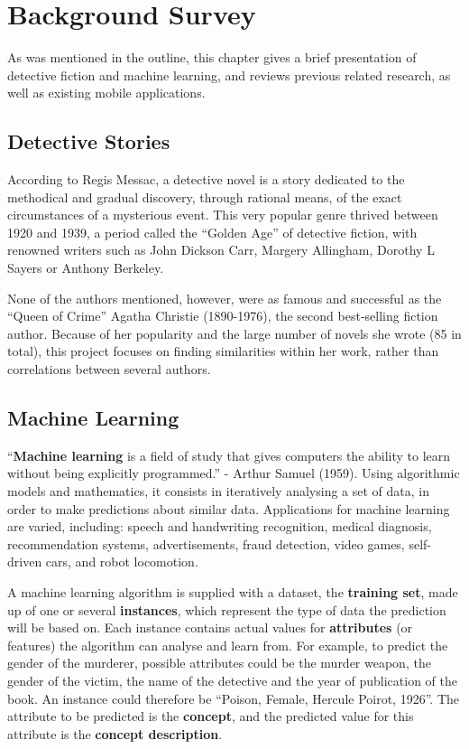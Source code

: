 \documentclass{mproj}
\begin{document}
\chapter{Background Survey}\label{survey}

As was mentioned in the outline, this chapter gives a brief presentation of detective fiction and machine learning, and reviews previous related research, as well as existing mobile applications.

\section{Detective Stories}

According to Regis Messac, a detective novel is a story dedicated to the methodical and gradual discovery, through rational means, of the exact circumstances of a mysterious event. \cite{detectivenovel} This very popular genre thrived between 1920 and 1939, a period called the ``Golden Age'' of detective fiction, with renowned writers such as John Dickson Carr, Margery Allingham, Dorothy L Sayers or Anthony Berkeley. \cite{detectiveauthors}

None of the authors mentioned, however, were as famous and successful as the ``Queen of Crime'' Agatha Christie (1890-1976), the second best-selling fiction author. \cite{bestseller} Because of her popularity and the large number of novels she wrote (85 in total), this project focuses on finding similarities within her work, rather than correlations between several authors.

\section{Machine Learning}\label{machine_learning}
``\textbf{Machine learning} is a field of study that gives computers the ability to learn without being explicitly programmed.'' - Arthur Samuel (1959). \cite[Chapter~3]{quotearthursamuel} Using algorithmic models and mathematics, it consists in iteratively analysing a set of data, in order to make predictions about similar data. Applications for machine learning are varied, including: speech and handwriting recognition, medical diagnosis, recommendation systems, advertisements, fraud detection, video games, self-driven cars, and robot locomotion. \par 

A machine learning algorithm is supplied with a dataset, the \textbf{training set}, made up of one or several \textbf{instances}, which represent the type of data the prediction will be based on. Each instance contains actual values for \textbf{attributes} (or features) the algorithm can analyse and learn from. \cite[Chapter~2]{wekabook} For example, to predict the gender of the murderer, possible attributes could be the murder weapon, the gender of the victim, the name of the detective and the year of publication of the book. An instance could therefore be ``Poison, Female, Hercule Poirot, 1926''. The attribute to be predicted is the \textbf{concept}, and the predicted value for this attribute is the \textbf{concept description}. \par 
\end{document}
